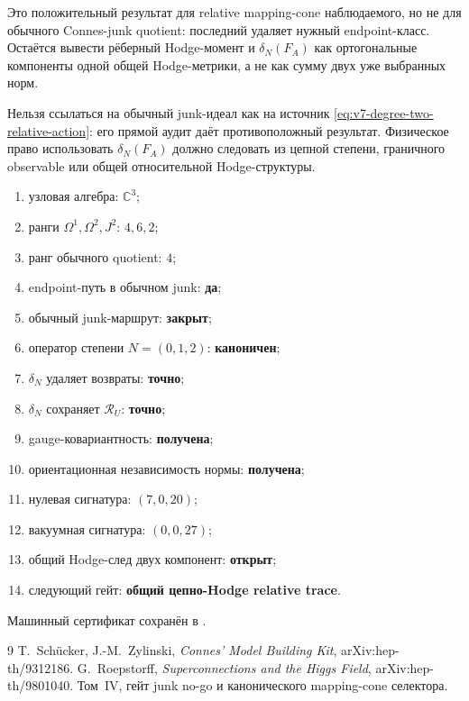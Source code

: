 \begin{remark}
Это положительный результат для relative mapping-cone наблюдаемого, но не
для обычного Connes-junk quotient: последний удаляет нужный endpoint-класс.
Остаётся вывести рёберный Hodge-момент и $\delta_N(F_A)$ как ортогональные
компоненты одной общей Hodge-метрики, а не как сумму двух уже выбранных норм.
\end{remark}

\begin{nogocriterion}
Нельзя ссылаться на обычный junk-идеал как на источник
\eqref{eq:v7-degree-two-relative-action}: его прямой аудит даёт
противоположный результат. Физическое право использовать
$\delta_N(F_A)$ должно следовать из цепной степени, граничного observable
или общей относительной Hodge-структуры.
\end{nogocriterion}

\begin{protocol}
\begin{enumerate}
 \item узловая алгебра: \textbf{$\mathbb C^3$};
 \item ранги $\Omega^1,\Omega^2,J^2$: \textbf{$4,6,2$};
 \item ранг обычного quotient: \textbf{$4$};
 \item endpoint-путь в обычном junk: \textbf{да};
 \item обычный junk-маршрут: \textbf{закрыт};
 \item оператор степени $N=(0,1,2)$: \textbf{каноничен};
 \item $\delta_N$ удаляет возвраты: \textbf{точно};
 \item $\delta_N$ сохраняет $\mathcal R_U$: \textbf{точно};
 \item gauge-ковариантность: \textbf{получена};
 \item ориентационная независимость нормы: \textbf{получена};
 \item нулевая сигнатура: \textbf{$(7,0,20)$};
 \item вакуумная сигнатура: \textbf{$(0,0,27)$};
 \item общий Hodge-след двух компонент: \textbf{открыт};
 \item следующий гейт: \textbf{общий цепно-Hodge relative trace}.
\end{enumerate}
\end{protocol}

Машинный сертификат сохранён в
.

\begin{thebibliography}{9}
T.~Sch\"ucker, J.-M.~Zylinski,
\emph{Connes' Model Building Kit},
arXiv:hep-th/9312186.
G.~Roepstorff,
\emph{Superconnections and the Higgs Field},
arXiv:hep-th/9801040.
Том~IV, гейт junk no-go и канонического mapping-cone селектора.
\end{thebibliography}